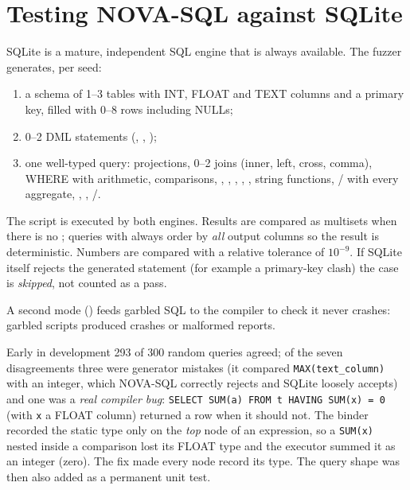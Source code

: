 \section{Testing NOVA-SQL against SQLite}
SQLite is a mature, independent SQL engine that is always available. The fuzzer  generates, per seed:
\begin{enumerate}
  \item a schema of 1--3 tables with INT, FLOAT and TEXT columns and a primary key, filled with 0--8 rows including NULLs;
  \item 0--2 DML statements (, , );
  \item one well-typed query: projections, 0--2 joins (inner, left, cross, comma), WHERE with arithmetic, comparisons, , , , , , string functions, / with every aggregate, , , /.
\end{enumerate}
The script is executed by both engines. Results are compared as multisets when there is no ; queries with  always order by \emph{all} output columns so the result is deterministic. Numbers are compared with a relative tolerance of $10^{-9}$. If SQLite itself rejects the generated statement (for example a primary-key clash) the case is \emph{skipped}, not counted as a pass.

A second mode () feeds garbled SQL to the compiler to check it never crashes: \SQLMutN{} garbled scripts produced \SQLMutBad{} crashes or malformed reports.

\begin{bugbox}
Early in development 293 of 300 random queries agreed; of the seven disagreements three were generator mistakes (it compared \texttt{MAX(text\_column)} with an integer, which NOVA-SQL correctly rejects and SQLite loosely accepts) and one was a \emph{real compiler bug}: \verb|SELECT SUM(a) FROM t HAVING SUM(x) = 0| (with \texttt{x} a FLOAT column) returned a row when it should not. The binder recorded the static type only on the \emph{top} node of an expression, so a \texttt{SUM(x)} nested inside a comparison lost its FLOAT type and the executor summed it as an integer (zero). The fix made every node record its type. The query shape was then also added as a permanent unit test.
\end{bugbox}


